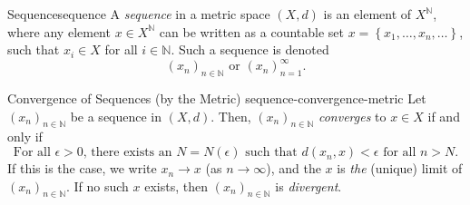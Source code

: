 \documentclass{article}
\numberwithin{equation}{section}
\numberwithin{figure}{section}
\begin{document}
\begin{definition}{Sequence}{sequence}
    A \emph{sequence} in a metric space $ (X, d) $ is an element of $
    X^\mathbb{N} $, where any element $ x \in X^\mathbb{N} $ can be written as a
    countable set $ x = \left\{ x_1, \ldots, x_n, \ldots \right\} $, such that
    $ x_i \in X $ for all $ i \in \mathbb{N} $. Such a sequence is denoted
    \begin{equation}
        \left( x_n \right)_{n \in \mathbb{N}} \text{ or }
        \left( x_n \right)_{n=1}^\infty.
    \end{equation}
\end{definition}
\begin{definition}{Convergence of Sequences (by the Metric)}
        {sequence-convergence-metric}
    Let $ \left( x_n \right)_{n \in \mathbb{N}} $ be a sequence in $ (X, d) $.
    Then, $ \left( x_n \right)_{n \in \mathbb{N}} $ \emph{converges} to $ x \in
    X $ if and only if
    \begin{equation}
        \text{For all } \epsilon > 0 \text{, there exists an } N=N(\epsilon)
        \text{ such that } d(x_n, x) < \epsilon \text{ for all } n > N.
    \end{equation}
    If this is the case, we write $ x_n \to x $ (as $ n \to \infty $), and the $
    x $ is \emph{the} (unique) limit of $ \left(x_n\right)_{n \in \mathbb{N}} $.
    If no such $ x $ exists, then $ \left(x_n\right)_{n \in \mathbb{N}} $ is
    \emph{divergent}.

    \centering
\end{definition}
\end{document}
